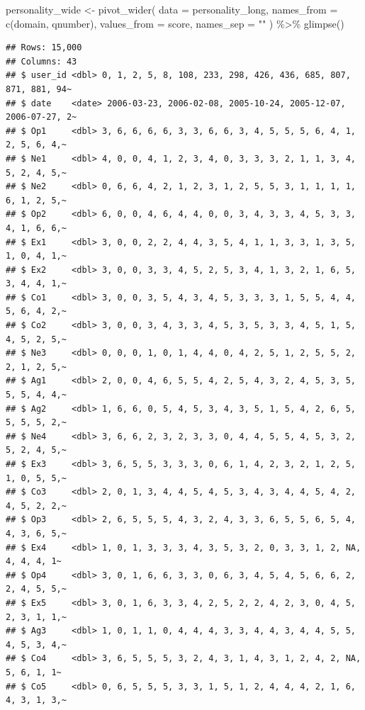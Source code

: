 \documentclass[
  oneside]{book}
\newenvironment{Shaded}{\begin{snugshade}}{\end{snugshade}}
\newcommand{\AttributeTok}[1]{\textcolor[rgb]{0.77,0.63,0.00}{#1}}
\newcommand{\FunctionTok}[1]{\textcolor[rgb]{0.00,0.00,0.00}{#1}}
\newcommand{\NormalTok}[1]{#1}
\newcommand{\OtherTok}[1]{\textcolor[rgb]{0.56,0.35,0.01}{#1}}
\newcommand{\SpecialCharTok}[1]{\textcolor[rgb]{0.00,0.00,0.00}{#1}}
\newcommand{\StringTok}[1]{\textcolor[rgb]{0.31,0.60,0.02}{#1}}
\begin{document}
\begin{Shaded}
\begin{Highlighting}[]
\NormalTok{personality\_wide }\OtherTok{\textless{}{-}} \FunctionTok{pivot\_wider}\NormalTok{(}
  \AttributeTok{data =}\NormalTok{ personality\_long,}
  \AttributeTok{names\_from =} \FunctionTok{c}\NormalTok{(domain, qnumber),}
  \AttributeTok{values\_from =}\NormalTok{ score,}
  \AttributeTok{names\_sep =} \StringTok{""}
\NormalTok{) }\SpecialCharTok{\%\textgreater{}\%}
  \FunctionTok{glimpse}\NormalTok{()}
\end{Highlighting}
\end{Shaded}

\begin{verbatim}
## Rows: 15,000
## Columns: 43
## $ user_id <dbl> 0, 1, 2, 5, 8, 108, 233, 298, 426, 436, 685, 807, 871, 881, 94~
## $ date    <date> 2006-03-23, 2006-02-08, 2005-10-24, 2005-12-07, 2006-07-27, 2~
## $ Op1     <dbl> 3, 6, 6, 6, 6, 3, 3, 6, 6, 3, 4, 5, 5, 5, 6, 4, 1, 2, 5, 6, 4,~
## $ Ne1     <dbl> 4, 0, 0, 4, 1, 2, 3, 4, 0, 3, 3, 3, 2, 1, 1, 3, 4, 5, 2, 4, 5,~
## $ Ne2     <dbl> 0, 6, 6, 4, 2, 1, 2, 3, 1, 2, 5, 5, 3, 1, 1, 1, 1, 6, 1, 2, 5,~
## $ Op2     <dbl> 6, 0, 0, 4, 6, 4, 4, 0, 0, 3, 4, 3, 3, 4, 5, 3, 3, 4, 1, 6, 6,~
## $ Ex1     <dbl> 3, 0, 0, 2, 2, 4, 4, 3, 5, 4, 1, 1, 3, 3, 1, 3, 5, 1, 0, 4, 1,~
## $ Ex2     <dbl> 3, 0, 0, 3, 3, 4, 5, 2, 5, 3, 4, 1, 3, 2, 1, 6, 5, 3, 4, 4, 1,~
## $ Co1     <dbl> 3, 0, 0, 3, 5, 4, 3, 4, 5, 3, 3, 3, 1, 5, 5, 4, 4, 5, 6, 4, 2,~
## $ Co2     <dbl> 3, 0, 0, 3, 4, 3, 3, 4, 5, 3, 5, 3, 3, 4, 5, 1, 5, 4, 5, 2, 5,~
## $ Ne3     <dbl> 0, 0, 0, 1, 0, 1, 4, 4, 0, 4, 2, 5, 1, 2, 5, 5, 2, 2, 1, 2, 5,~
## $ Ag1     <dbl> 2, 0, 0, 4, 6, 5, 5, 4, 2, 5, 4, 3, 2, 4, 5, 3, 5, 5, 5, 4, 4,~
## $ Ag2     <dbl> 1, 6, 6, 0, 5, 4, 5, 3, 4, 3, 5, 1, 5, 4, 2, 6, 5, 5, 5, 5, 2,~
## $ Ne4     <dbl> 3, 6, 6, 2, 3, 2, 3, 3, 0, 4, 4, 5, 5, 4, 5, 3, 2, 5, 2, 4, 5,~
## $ Ex3     <dbl> 3, 6, 5, 5, 3, 3, 3, 0, 6, 1, 4, 2, 3, 2, 1, 2, 5, 1, 0, 5, 5,~
## $ Co3     <dbl> 2, 0, 1, 3, 4, 4, 5, 4, 5, 3, 4, 3, 4, 4, 5, 4, 2, 4, 5, 2, 2,~
## $ Op3     <dbl> 2, 6, 5, 5, 5, 4, 3, 2, 4, 3, 3, 6, 5, 5, 6, 5, 4, 4, 3, 6, 5,~
## $ Ex4     <dbl> 1, 0, 1, 3, 3, 3, 4, 3, 5, 3, 2, 0, 3, 3, 1, 2, NA, 4, 4, 4, 1~
## $ Op4     <dbl> 3, 0, 1, 6, 6, 3, 3, 0, 6, 3, 4, 5, 4, 5, 6, 6, 2, 2, 4, 5, 5,~
## $ Ex5     <dbl> 3, 0, 1, 6, 3, 3, 4, 2, 5, 2, 2, 4, 2, 3, 0, 4, 5, 2, 3, 1, 1,~
## $ Ag3     <dbl> 1, 0, 1, 1, 0, 4, 4, 4, 3, 3, 4, 4, 3, 4, 4, 5, 5, 4, 5, 3, 4,~
## $ Co4     <dbl> 3, 6, 5, 5, 5, 3, 2, 4, 3, 1, 4, 3, 1, 2, 4, 2, NA, 5, 6, 1, 1~
## $ Co5     <dbl> 0, 6, 5, 5, 5, 3, 3, 1, 5, 1, 2, 4, 4, 4, 2, 1, 6, 4, 3, 1, 3,~

\end{verbatim}
\end{document}
